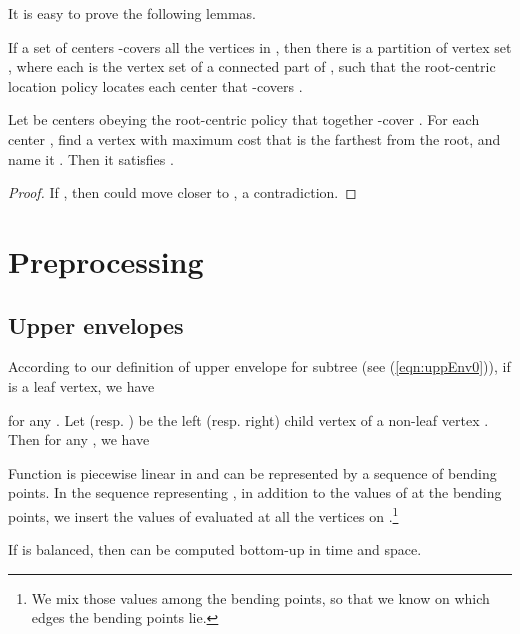 \documentclass{llncs}
\newcommand{\hide}[1]{}
\newcommand{\QED}{\hfill}
\begin{document}
{It is easy to prove the following lemmas.
\begin{lemma}\label{lem:location}
If a set of  centers -covers all the vertices in ,
then there is a partition of vertex set ,
where each  is the vertex set of a connected part of ,
such that the root-centric location policy locates each center  that -covers .
\QED
\end{lemma}
\hide{\begin{proof}
Consider a set  of centers that together -covers ,
but some centers violate the root-centric location policy.
For each , 
let  be the set of vertices that are closer to  than to any other center.
If there is a tie, then the tie should be broken arbitrarily.
It is clear that  is -covered by .
We now move  towards the root  as far as possible without affecting its coverage
of .
The resulting centers  satisfy the root-centric location policy.
\end{proof}
}

\begin{lemma}\label{lem:Rcentric}
Let   be  centers obeying the root-centric policy
that together -cover .
For each center , find a vertex  with maximum cost 
that is the farthest from the root,
and name it .
Then it satisfies .
\end{lemma}
\begin{proof}
If , then  could move closer to ,
a contradiction.
\QED
\end{proof}


\section{Preprocessing}\label{sec:preproc}

\subsection{Upper envelopes}
According to our definition of upper envelope  for subtree  (see (\ref{eqn:uppEnv0})),
if  is a leaf vertex, we have

for any .
Let  (resp. ) be the left (resp. right) child vertex of a non-leaf vertex .
Then for any , we have

Function  is piecewise linear in  and can be represented by a sequence of
bending points.
In the sequence representing ,
in addition to the values of  at the bending points,
we insert the values of  evaluated at all the  vertices on .\footnote{We mix
those values among the bending points,
so that we know on which edges the bending points lie.}
\begin{lemma}\label{lem:envelope}
If  is balanced, then 
 can be computed bottom-up in  time
and  space.
\QED
\end{lemma}

}
\end{document}
